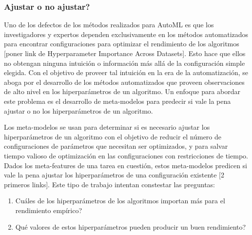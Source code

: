 \subsubsection{Ajustar o no ajustar?}


Uno de los defectos de los métodos realizados para AutoML es que los investigadores y expertos dependen exclusivamente en los métodos automatizados para encontrar configuraciones para optimizar el rendimiento de los algoritmos [poner link de Hyperparameter Importance Across Datasets]. Esto hace que ellos no obtengan ninguna intuición o información más allá de la configuración simple elegida. Con el objetivo de proveer tal intuición en la era de la automatización, se aboga por el desarrollo de los métodos automatizados que proveen observaciones de alto nivel en los hiperparámetros de un algoritmo. Un enfoque para abordar este problema es el desarrollo de meta-modelos para predecir si vale la pena ajustar o no los hiperparámetros de un algoritmo.

Los meta-modelos se usan para determinar si es necesario ajustar los hiperparámetros de un algoritmo con el objetivo de reducir el número de configuraciones de parámetros que necesitan ser optimizados, y para salvar tiempo valioso de optimización en las configuraciones con restricciones de tiempo. Dados los meta-features de una tarea en cuestión, estos meta-modelos predicen si vale la pena ajustar los hiperparámetros de una configuración existente [2 primeros links]. Este tipo de trabajo intentan constestar las preguntas: 
\begin{enumerate}
	\item \textquestiondown Cuáles de los hiperparámetros de los algoritmos importan más para el rendimiento empírico?
	\item \textquestiondown Qué valores de estos hiperparámetros pueden producir un buen rendimiento?
\end{enumerate}

